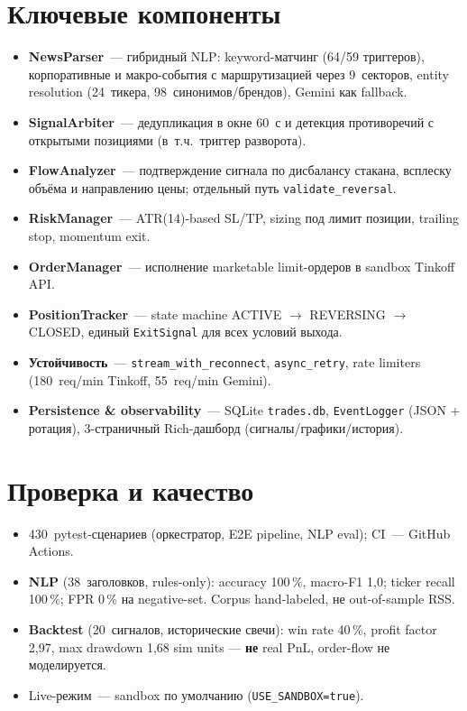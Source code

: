 \documentclass[10pt,a4paper]{article}
\begin{document}
\section*{Ключевые компоненты}
\begin{itemize}
  \item \textbf{NewsParser}~--- гибридный NLP: keyword-матчинг (64/59 триггеров), корпоративные и макро-события с маршрутизацией через 9~секторов, entity resolution (24~тикера, 98~синонимов/брендов), Gemini как fallback.
  \item \textbf{SignalArbiter}~--- дедупликация в окне 60~с и детекция противоречий с открытыми позициями (в~т.ч.\ триггер разворота).
  \item \textbf{FlowAnalyzer}~--- подтверждение сигнала по дисбалансу стакана, всплеску объёма и направлению цены; отдельный путь \texttt{validate\_reversal}.
  \item \textbf{RiskManager}~--- ATR(14)-based SL/TP, sizing под лимит позиции, trailing stop, momentum exit.
  \item \textbf{OrderManager}~--- исполнение marketable limit-ордеров в sandbox Tinkoff API.
  \item \textbf{PositionTracker}~--- state machine \textsf{ACTIVE} $\to$ \textsf{REVERSING} $\to$ \textsf{CLOSED}, единый \texttt{ExitSignal} для всех условий выхода.
  \item \textbf{Устойчивость}~--- \texttt{stream\_with\_reconnect}, \texttt{async\_retry}, rate limiters (180~req/min Tinkoff, 55~req/min Gemini).
  \item \textbf{Persistence \& observability}~--- SQLite \texttt{trades.db}, \texttt{EventLogger} (JSON + ротация), 3-страничный Rich-дашборд (сигналы/графики/история).
\end{itemize}

\section*{Проверка и качество}
\begin{itemize}
  \item 430~pytest-сценариев (оркестратор, E2E pipeline, NLP eval); CI~--- GitHub Actions.
  \item \textbf{NLP} (38~заголовков, rules-only): accuracy 100\,\%, macro-F1 1{,}0; ticker recall 100\,\%; FPR 0\,\% на negative-set. Corpus hand-labeled, не out-of-sample RSS.
  \item \textbf{Backtest} (20~сигналов, исторические свечи): win rate 40\,\%, profit factor 2{,}97, max drawdown 1{,}68 sim units --- \textbf{не} real PnL, order-flow не моделируется.
  \item Live-режим~--- sandbox по умолчанию (\texttt{USE\_SANDBOX=true}).
\end{itemize}
\end{document}
